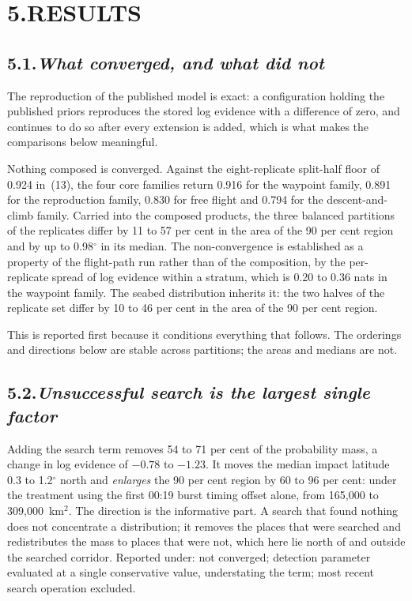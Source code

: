 \documentclass[12pt,a4paper]{article}
\begin{document}
\section*{5.\quad RESULTS}

\subsection*{5.1.\quad \textit{What converged, and what did not}}

The reproduction of the published model is exact: a configuration holding the published priors
reproduces the stored log evidence with a difference of zero, and continues to do so after every
extension is added, which is what makes the comparisons below meaningful.

Nothing composed is converged. Against the eight-replicate split-half floor of 0.924 in~(13),
the four core families return 0.916 for the waypoint family, 0.891 for the reproduction family,
0.830 for free flight and 0.794 for the descent-and-climb family. Carried into the composed
products, the three balanced partitions of the replicates differ by 11 to 57 per cent in the
area of the 90 per cent region and by up to 0.98$^\circ$ in its median. The non-convergence is
established as a property of the flight-path run rather than of the composition, by the
per-replicate spread of log evidence within a stratum, which is 0.20 to 0.36 nats in the
waypoint family. The seabed distribution inherits it: the two halves of the replicate set differ
by 10 to 46 per cent in the area of the 90 per cent region.

This is reported first because it conditions everything that follows. The orderings and
directions below are stable across partitions; the areas and medians are not.

\subsection*{5.2.\quad \textit{Unsuccessful search is the largest single factor}}

Adding the search term removes 54 to 71 per cent of the probability mass, a change in log
evidence of $-0.78$ to $-1.23$. It moves the median impact latitude 0.3 to 1.2$^\circ$ north and
\emph{enlarges} the 90 per cent region by 60 to 96 per cent: under the treatment using the first
00:19 burst timing offset alone, from 165{,}000 to 309{,}000~km$^2$. The direction is the
informative part. A search that found nothing does not concentrate a distribution; it removes the
places that were searched and redistributes the mass to places that were not, which here lie
north of and outside the searched corridor. Reported under: not converged; detection parameter
evaluated at a single conservative value, understating the term; most recent search operation
excluded.
\end{document}
